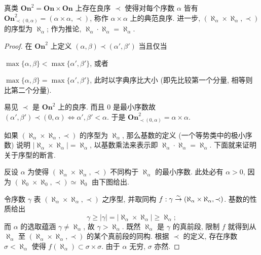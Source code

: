 \begin{theorem}\label{prop:Ord2-canonical}
	真类 $\textbf{On}^2 = \textbf{On} \times \textbf{On}$ 上存在良序 $\prec$ 使得对每个序数 $\alpha$ 皆有 $\textbf{On}^2_{\prec (0, \alpha)} = (\alpha \times \alpha, \prec)$, 称作 $\alpha \times \alpha$ 上的典范良序. 进一步, $(\aleph_\alpha \times \aleph_\alpha, \prec)$ 的序型为 $\aleph_\alpha$; 作为推论, $\aleph_\alpha \cdot \aleph_\alpha = \aleph_\alpha$.
\end{theorem}
\begin{proof}
	在 $\textbf{On}^2$ 上定义 $(\alpha, \beta) \prec (\alpha', \beta')$ 当且仅当
	\begin{compactitem}
		\item $\max\{\alpha, \beta\} < \max\{\alpha', \beta'\}$, 或者
		\item $\max\{\alpha, \beta\} = \max\{\alpha', \beta'\}$, 此时以字典序比大小 (即先比较第一个分量, 相等则比第二个分量).
	\end{compactitem}
	易见 $\prec$ 是 $\textbf{On}^2$ 上的良序. 而且 $0$ 是最小序数故 $(\alpha', \beta') \prec (0, \alpha) \iff \alpha', \beta' < \alpha$. 于是 $\textbf{On}^2_{\prec (0, \alpha)} = \alpha \times \alpha$.
	
	如果 $(\aleph_\alpha \times \aleph_\alpha, \prec)$ 的序型为 $\aleph_\alpha$, 那么基数的定义 (一个等势类中的极小序数) 说明 $|\aleph_\alpha \times \aleph_\alpha| = \aleph_\alpha$, 以基数乘法来表示即 $\aleph_\alpha \cdot \aleph_\alpha = \aleph_\alpha$. 下面就来证明关于序型的断言.

	反设 $\alpha$ 为使得 $(\aleph_\alpha \times \aleph_\alpha, \prec)$ 不同构于 $\aleph_\alpha$ 的最小序数. 此处必有 $\alpha > 0$, 因为 $(\aleph_0 \times \aleph_0, \prec) \simeq \aleph_0$ 由下图给出.
	\begin{center} \qquad {}\end{center}
	令序数 $\gamma$ 表 $(\aleph_\alpha \times \aleph_\alpha, \prec)$ 之序型, 并取同构 $f: \gamma \stackrel{\sim}{\rightarrow} (\aleph_\alpha \times \aleph_\alpha, \prec)$. 基数的性质给出
	\[ \gamma \geq |\gamma| = |\aleph_\alpha \times \aleph_\alpha| \geq \aleph_\alpha; \]
	而 $\alpha$ 的选取蕴涵 $\gamma \neq \aleph_\alpha$, 故 $\gamma > \aleph_\alpha$. 既然 $\aleph_\alpha$ 是 $\gamma$ 的真前段, 限制 $f$ 就得到从 $\aleph_\alpha$ 至 $(\aleph_\alpha \times \aleph_\alpha, \prec)$ 的某个真前段的同构. 根据 $\prec$ 的定义, 存在序数 $\sigma < \aleph_\alpha$ 使得 $f(\aleph_\alpha) \subset \sigma \times \sigma$. 由于 $\alpha$ 无穷, $\sigma$ 亦然.
	

\end{proof}
